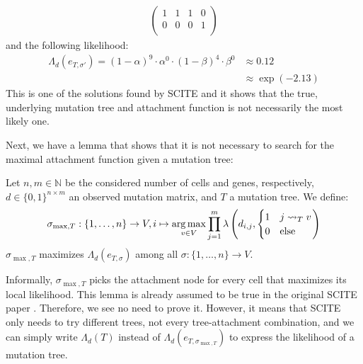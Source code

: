 \begin{example}
\begin{align*}
\begin{pmatrix}
            1 & 1 & 1 & 0 \\
            0 & 0 & 0 & 1 \\
        \end{pmatrix}
    \end{align*}
    and the following likelihood:
    \begin{align*}
        \Lambda_d(e_{T, \sigma'}) = (1-\alpha)^{9} \cdot \alpha^{0} \cdot (1-\beta)^{4} \cdot \beta^{0} &\approx 0.12 \\
        &\approx \exp(-2.13) 
    \end{align*}
    This is one of the solutions found by \ac{SCITE} and it shows that the true, underlying mutation tree and attachment function is not necessarily the most likely one.
\end{example}

Next, we have a lemma that shows that it is not necessary to search for the maximal attachment function given a mutation tree:

\begin{lemma}
    \label{lem:max_attachment}
    Let $n, m \in \mathbb{N}$ be the considered number of cells and genes, respectively, $d \in \{0,1\}^{n \times m}$ an observed mutation matrix, and $T$ a mutation tree. We define:
    \begin{align*}
        \sigma_{\max, T}: \{1, \dots, n\} \rightarrow V, i \mapsto \operatorname*{arg\,max}_{v \in V} \prod_{j = 1}^m \lambda \left(d_{i,j}, \begin{cases}
            1 & j \leadsto_T v \\
            0 & \mathrm{else} \\
        \end{cases}\right)
    \end{align*}
    $\sigma_{\max, T}$ maximizes $\Lambda_d (e_{T, \sigma})$ among all $\sigma: \{1, \dots, n\} \rightarrow V$.
\end{lemma}

Informally, $\sigma_{\max, T}$ picks the attachment node for every cell that maximizes its local likelihood. This lemma is already assumed to be true in the original SCITE paper \cite{tree2016}. Therefore, we see no need to prove it. However, it means that SCITE only needs to try different trees, not every tree-attachment combination, and we can simply write $\Lambda_d(T)$ instead of $\Lambda_d(e_{T, \sigma_{\max, T}})$ to express the likelihood of a mutation tree. 


